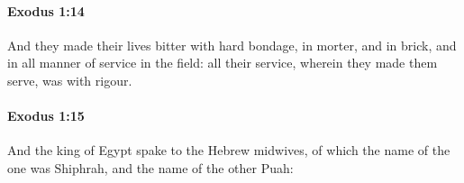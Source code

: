 		\paragraph{Exodus 1:14} %
			\label{EXODUS-1-14}

			And they made their lives bitter with hard bondage, in morter, and in brick, and in all manner of service in the field: all their service, wherein they made them serve, was with rigour.


		\paragraph{Exodus 1:15} %
			\label{EXODUS-1-15}

			And the king of Egypt spake to the Hebrew midwives, of which the name of the one was Shiphrah, and the name of the other Puah:


